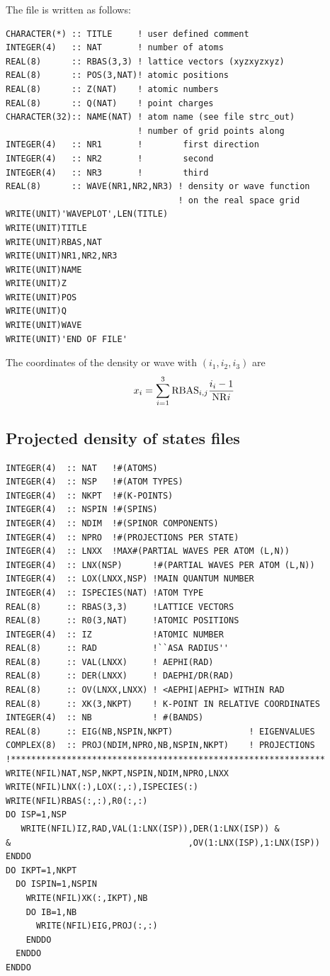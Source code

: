 \documentclass[final,12pt,makeidx,DIV=calc]{article}
\begin{document}
{{{{{{The file is written as follows:
\small{
\begin{verbatim}
CHARACTER(*) :: TITLE     ! user defined comment
INTEGER(4)   :: NAT       ! number of atoms
REAL(8)      :: RBAS(3,3) ! lattice vectors (xyzxyzxyz)
REAL(8)      :: POS(3,NAT)! atomic positions
REAL(8)      :: Z(NAT)    ! atomic numbers 
REAL(8)      :: Q(NAT)    ! point charges
CHARACTER(32):: NAME(NAT) ! atom name (see file strc_out)
                          ! number of grid points along 
INTEGER(4)   :: NR1       !        first direction
INTEGER(4)   :: NR2       !        second
INTEGER(4)   :: NR3       !        third
REAL(8)      :: WAVE(NR1,NR2,NR3) ! density or wave function 
                                  ! on the real space grid
WRITE(UNIT)'WAVEPLOT',LEN(TITLE)
WRITE(UNIT)TITLE
WRITE(UNIT)RBAS,NAT
WRITE(UNIT)NR1,NR2,NR3
WRITE(UNIT)NAME
WRITE(UNIT)Z
WRITE(UNIT)POS
WRITE(UNIT)Q
WRITE(UNIT)WAVE
WRITE(UNIT)'END OF FILE'
\end{verbatim}
}

The coordinates of the density or wave with $(i_1,i_2,i_3)$ are 
\begin{equation}
  x_i=\sum_{i=1}^{3} {\rm RBAS}_{i,j}{{i_i-1}\over{{\rm NR}i}} 
\end{equation}

\subsection{Projected density of states files}
\begin{verbatim}
INTEGER(4)  :: NAT   !#(ATOMS)
INTEGER(4)  :: NSP   !#(ATOM TYPES)
INTEGER(4)  :: NKPT  !#(K-POINTS)
INTEGER(4)  :: NSPIN !#(SPINS)
INTEGER(4)  :: NDIM  !#(SPINOR COMPONENTS)
INTEGER(4)  :: NPRO  !#(PROJECTIONS PER STATE)
INTEGER(4)  :: LNXX  !MAX#(PARTIAL WAVES PER ATOM (L,N))
INTEGER(4)  :: LNX(NSP)      !#(PARTIAL WAVES PER ATOM (L,N))
INTEGER(4)  :: LOX(LNXX,NSP) !MAIN QUANTUM NUMBER
INTEGER(4)  :: ISPECIES(NAT) !ATOM TYPE
REAL(8)     :: RBAS(3,3)     !LATTICE VECTORS
REAL(8)     :: R0(3,NAT)     !ATOMIC POSITIONS 
INTEGER(4)  :: IZ            !ATOMIC NUMBER
REAL(8)     :: RAD           !``ASA RADIUS''
REAL(8)     :: VAL(LNXX)     ! AEPHI(RAD)
REAL(8)     :: DER(LNXX)     ! DAEPHI/DR(RAD)
REAL(8)     :: OV(LNXX,LNXX) ! <AEPHI|AEPHI> WITHIN RAD
REAL(8)     :: XK(3,NKPT)    ! K-POINT IN RELATIVE COORDINATES
INTEGER(4)  :: NB            ! #(BANDS)
REAL(8)     :: EIG(NB,NSPIN,NKPT)               ! EIGENVALUES
COMPLEX(8)  :: PROJ(NDIM,NPRO,NB,NSPIN,NKPT)    ! PROJECTIONS
!**************************************************************
WRITE(NFIL)NAT,NSP,NKPT,NSPIN,NDIM,NPRO,LNXX
WRITE(NFIL)LNX(:),LOX(:,:),ISPECIES(:)
WRITE(NFIL)RBAS(:,:),R0(:,:)
DO ISP=1,NSP
   WRITE(NFIL)IZ,RAD,VAL(1:LNX(ISP)),DER(1:LNX(ISP)) &
&                                   ,OV(1:LNX(ISP),1:LNX(ISP))
ENDDO
DO IKPT=1,NKPT
  DO ISPIN=1,NSPIN
    WRITE(NFIL)XK(:,IKPT),NB
    DO IB=1,NB
      WRITE(NFIL)EIG,PROJ(:,:)
    ENDDO
  ENDDO
ENDDO
\end{verbatim}


}}}}}}
\end{document}
